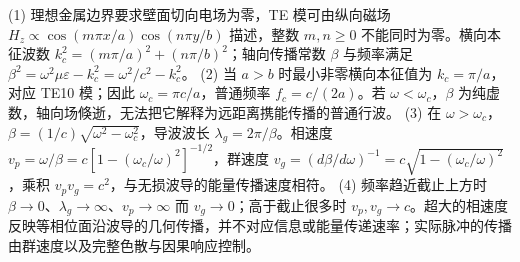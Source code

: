 (1) 理想金属边界要求壁面切向电场为零，TE 模可由纵向磁场 \(H_z\propto\cos(m\pi x/a)\cos(n\pi y/b)\) 描述，整数 \(m,n\ge0\) 不能同时为零。横向本征波数 \(k_c^2=(m\pi/a)^2+(n\pi/b)^2\)；轴向传播常数 \(\beta\) 与频率满足 \(\beta^2=\omega^2\mu\varepsilon-k_c^2=\omega^2/c^2-k_c^2\)。
(2) 当 \(a>b\) 时最小非零横向本征值为 \(k_c=\pi/a\)，对应 TE10 模；因此 \(\omega_c=\pi c/a\)，普通频率 \(f_c=c/(2a)\)。若 \(\omega<\omega_c\)，\(\beta\) 为纯虚数，轴向场倏逝，无法把它解释为远距离携能传播的普通行波。
(3) 在 \(\omega>\omega_c\)，\(\beta=(1/c)\sqrt{\omega^2-\omega_c^2}\)，导波波长 \(\lambda_g=2\pi/\beta\)。相速度 \(v_p=\omega/\beta=c[1-(\omega_c/\omega)^2]^{-1/2}\)，群速度 \(v_g=(d\beta/d\omega)^{-1}=c\sqrt{1-(\omega_c/\omega)^2}\)，乘积 \(v_pv_g=c^2\)，与无损波导的能量传播速度相符。
(4) 频率趋近截止上方时 \(\beta\to0\)、\(\lambda_g\to\infty\)、\(v_p\to\infty\) 而 \(v_g\to0\)；高于截止很多时 \(v_p,v_g\to c\)。超大的相速度反映等相位面沿波导的几何传播，并不对应信息或能量传递速率；实际脉冲的传播由群速度以及完整色散与因果响应控制。
